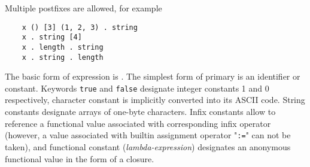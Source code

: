 Multiple postfixes are allowed, for example

\begin{lstlisting}
    x () [3] (1, 2, 3) . string
    x . string [4]
    x . length . string
    x . string . length
\end{lstlisting}

The basic form of expression is . The simplest form of primary is an identifier or constant. Keywords \lstinline|true| and \lstinline|false|
designate integer constants 1 and 0 respectively, character constant is implicitly converted into its \textsc{ASCII} code.  String constants designate arrays
of one-byte characters. Infix constants allow to reference a functional value associated with corresponding infix operator (however, a value associated with
builtin assignment operator "\lstinline|:=|" can not be taken), and functional constant (\emph{lambda-expression})
designates an anonymous functional value in the form of a closure. 

